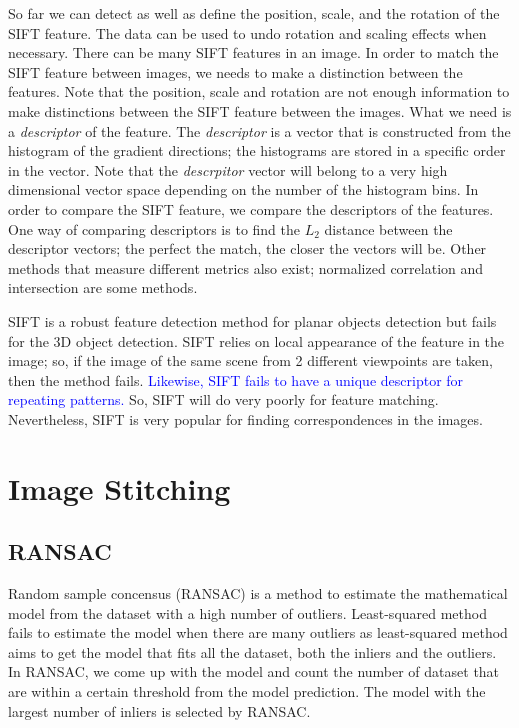 \documentclass{report}
\begin{document}
So far we can detect as well as define the position, scale, and the rotation of the SIFT feature. The data can be used to undo rotation and scaling effects when necessary. There can be many SIFT features in an image. In order to match the SIFT feature between images, we needs to make a distinction between the features. Note that the position, scale and rotation are not enough information to make distinctions between the SIFT feature between the images. What we need is a \textit{descriptor} of the feature. The \textit{descriptor} is a vector that is constructed from the histogram of the gradient directions; the histograms are stored in a specific order in the vector. Note that the \textit{descrpitor} vector will belong to a very high dimensional vector space depending on the number of the histogram bins. In order to compare the SIFT feature, we compare the descriptors of the features. One way of comparing descriptors is to find the $L_2$ distance between the descriptor vectors; the perfect the match, the closer the vectors will be. Other methods that measure different metrics also exist; normalized correlation and intersection are some methods.

SIFT is a robust feature detection method for planar objects detection but fails for the $3$D object detection. SIFT relies on local appearance of the feature in the image; so, if the image of the same scene from 2 different viewpoints are taken, then the method fails. \textcolor{blue}{Likewise, SIFT fails to have a unique descriptor for repeating patterns.} So, SIFT will do very poorly for feature matching. Nevertheless, SIFT is very popular for finding correspondences in the images.

\section{Image Stitching}
\subsection{RANSAC}
\hspace{\parindent}Random sample concensus (RANSAC) is a method to estimate the mathematical model from the dataset with a high number of outliers. Least-squared method fails to estimate the model when there are many outliers as least-squared method aims to get the model that fits all the dataset, both the inliers and the outliers. In RANSAC, we come up with the model and count the number of dataset that are within a certain threshold from the model prediction. The model with the largest number of inliers is selected by RANSAC.
\end{document}

